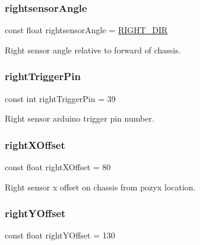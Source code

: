 \subsubsection{\texorpdfstring{rightsensor\+Angle}{rightsensorAngle}}
{\footnotesize\ttfamily const float rightsensor\+Angle = \mbox{\hyperlink{bot_main_8ino_a280580881770229c533faab28f235a05}{R\+I\+G\+H\+T\+\_\+\+D\+IR}}}



Right sensor angle relative to forward of chassis. 

\mbox{\label{bot_main_8ino_ad7785c889e9d6290073148f74ce9de5e}} 
\subsubsection{\texorpdfstring{right\+Trigger\+Pin}{rightTriggerPin}}
{\footnotesize\ttfamily const int right\+Trigger\+Pin = 39}



Right sensor arduino trigger pin number. 

\mbox{\label{bot_main_8ino_ac932cddb5bc68094c96d0034c92faef9}} 
\subsubsection{\texorpdfstring{right\+X\+Offset}{rightXOffset}}
{\footnotesize\ttfamily const float right\+X\+Offset = 80}



Right sensor x offset on chassis from pozyx location. 

\mbox{\label{bot_main_8ino_a07903b96b48e8e456debd9cc43c7af05}} 
\subsubsection{\texorpdfstring{right\+Y\+Offset}{rightYOffset}}
{\footnotesize\ttfamily const float right\+Y\+Offset = 130}



